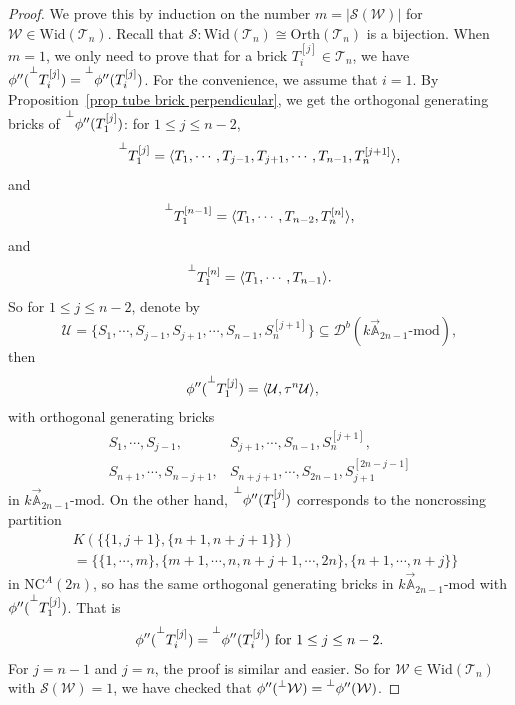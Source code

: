 \documentclass[a4paper, 11pt, reqno]{amsart}
\numberwithin{equation}{section}
\theoremstyle{remark}
\theoremstyle{definition}
\begin{document}
\begin{proof}
   We prove this by induction on the number $m=|\mathcal S(\mathcal W)|$ for $\mathcal W \in \mathrm{Wid}(\mathcal T_n)$. Recall that $\mathcal S:\mathrm{Wid}(\mathcal T_n) \cong \mathrm{Orth}(\mathcal T_n)$ is a bijection. When $m=1$, we only need to prove that for a brick $T_i^{[j]} \in \mathcal T_n$, we have $\phi''(\prescript{\perp}{}{T_i^{[j]}})=\prescript{\perp}{}{\phi''(T_i^{[j]})}$. For the convenience, we assume that $i=1$. By Proposition~\ref{prop tube brick perpendicular}, we get the orthogonal generating bricks of $\prescript{\perp}{}{\phi''(T_1^{[j]})}$: for $1 \leq j \leq n-2$, 
   \[\prescript{\perp}{}{T_1^{[j]}}=\langle T_1, \cdots, T_{j-1}, T_{j+1},\cdots, T_{n-1}, T_n^{[j+1]} \rangle,\]
   and 
   \[\prescript{\perp}{}{T_1^{[n-1]}}=\langle T_1, \cdots, T_{n-2}, T_n^{[n]} \rangle,\]
   and
   \[\prescript{\perp}{}{T_1^{[n]}}=\langle T_1, \cdots, T_{n-1} \rangle.\]
   So for $1 \leq j \leq n-2$, denote by 
   \[\mathcal U=\{ S_1, \cdots, S_{j-1}, S_{j+1},\cdots, S_{n-1}, S_n^{[j+1]}\} \subseteq \mathcal D^b(k \vec{\mathbb A}_{2n-1} \text{-} \mathrm{mod}), \]
   then
   \begin{align*}
      \phi''(\prescript{\perp}{}{T_1^{[j]}})&=\langle \mathcal U, \tau ^n \mathcal U\rangle, 
   \end{align*}
   with orthogonal generating bricks
   \begin{align*}
      S_1, \cdots, S_{j-1}, &S_{j+1},\cdots, S_{n-1}, S_n^{[j+1]},\\S_{n+1},\cdots, S_{n-j+1}, &S_{n+j+1}, \cdots, S_{2n-1}, S_{j+1}^{[2n-j-1]}
   \end{align*}
   in $k \vec{\mathbb A}_{2n-1} \text{-} \mathrm{mod}$. On the other hand, 
   $\prescript{\perp}{}{\phi''(T_1^{[j]})}$ corresponds to the noncrossing partition
   \begin{align*}
      &K(\{\{1,j+1\},\{n+1,n+j+1\}\})\\
      &=\{ \{1,\cdots,m \},\{m+1,\cdots,n,n+j+1,\cdots, 2n\},\{n+1,\cdots,n+j\} \}
   \end{align*}
   in $\mathrm{NC}^{A}(2n)$, so has the same orthogonal generating bricks in $k \vec{\mathbb A}_{2n-1} \text{-} \mathrm{mod}$ with $\phi''(\prescript{\perp}{}{T_1^{[j]}})$. That is 
   \[
      \phi''(\prescript{\perp}{}{T_i^{[j]}})=\prescript{\perp}{}{\phi''(T_i^{[j]})} \text{ for } 1 \leq j \leq n-2.
   \]
   For $j=n-1$ and $j=n$, the proof is similar and easier. So for $\mathcal W \in \mathrm{Wid}(\mathcal T_n)$ with $\mathcal S(\mathcal W)=1$, we have checked that $\phi''(\prescript{\perp}{}{\mathcal W})=\prescript{\perp}{}{\phi''(\mathcal W)}$.


\end{proof}
\end{document}
